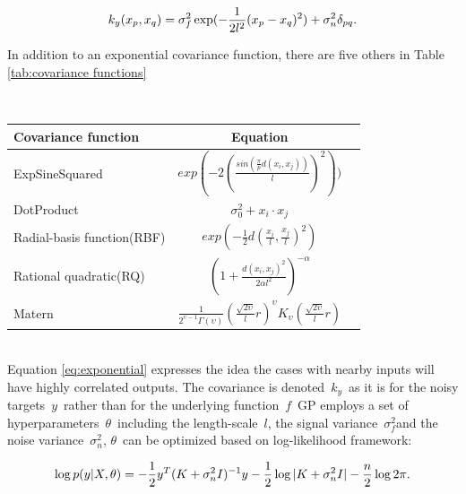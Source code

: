 \begin{equation}
\label{eq:exponential}
k_{y}(x_{p},x_{q})=\sigma_{f}^{2}\exp(-{1 \over 2l^{2}}(x_{p}-x_{q})^{2})+\sigma_{n}^{2}\delta_{pq}. 
\end{equation}

In addition to an exponential covariance function, there are five others in Table \ref{tab:covariance functions} 

\begin{minipage}{\linewidth}
	\centering
	\renewcommand\arraystretch{1.2}
	~\\
	 \label{tab:covariance functions} 
	\begin{tabular}{lcc}
		\hline
		{\small Covariance function}     & {\small Equation}    \\
		\hline
		{\small ExpSineSquared}              &  $exp(-2(\frac{sin(\frac{\pi}{p}d(x_i, x_j))}{l})^2))$     \\
		{\small DotProduct}              &  $\sigma_{0}^{2}+x_i\cdot x_j$     \\
		{\small Radial-basis function(RBF)}           & 
		$exp(-\frac{1}{2} d(\frac{x_i}{l},\frac{x_j}{l})^2) $    \\
		{\small Rational quadratic(RQ)} &
		$(1+\frac{ d(x_i,x_j)^2 }{2\alpha l^2})^{-\alpha}$           \\
		{\small Matern}              &  $\frac{1}{2^{\upsilon -1}\Gamma \left ( \upsilon  \right )}\left ( \frac{\sqrt{2\upsilon }}{l}r \right )^{\upsilon }K_{\upsilon }\left ( \frac{\sqrt{2\upsilon }}{l}r \right )$    \\
		\hline
	\end{tabular}
\end{minipage}
~\\
Equation \ref{eq:exponential} expresses the idea the cases with nearby inputs will have highly correlated outputs. The covariance is denoted $k_{y}$ as it is for the noisy targets $y$ rather than for the underlying function $f$ GP employs a set of hyperparameters $\theta$ including the length-scale $l$, the signal variance $\sigma _{f}^{2}$and the noise variance $\sigma _{n}^{2}$, $\theta$ can be optimized based on log-likelihood framework:

\begin{equation}
\label{eq:likelihood}
\log p({y}\vert {X},{\theta})=  -{1 \over 2}{y}^{T}({K}+\sigma_{n}^{2}{I})^{-1}y-{1 \over 2}\log\vert {K}+\sigma_{n}^{2}{I}\vert -{n \over 2}\log 2\pi.
\end{equation}

